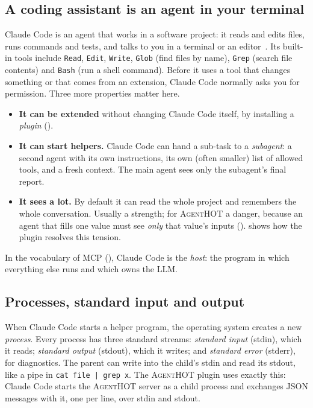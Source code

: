 \documentclass[10pt,a4paper]{article}
\newcommand{\tool}{\textsc{AgentHOT}}
\newcommand{\cc}{Claude Code}
\newcommand{\code}[1]{\texttt{#1}}
\begin{document}
\subsection{A coding assistant is an agent in your terminal}

\cc{} is an agent that works in a software project: it reads and edits
files, runs commands and tests, and talks to you in a terminal or an
editor~\cite{claudecodedocs}. Its built-in tools include \code{Read},
\code{Edit}, \code{Write}, \code{Glob} (find files by name), \code{Grep}
(search file contents) and \code{Bash} (run a shell command). Before it uses
a tool that changes something or that comes from an extension, \cc{}
normally asks you for permission. Three more properties matter here.

\begin{itemize}
\item \textbf{It can be extended} without changing \cc{} itself, by
installing a \emph{plugin} ().
\item \textbf{It can start helpers.} \cc{} can hand a sub-task to a
\emph{subagent}: a second agent with its own instructions, its own (often
smaller) list of allowed tools, and a fresh context. The main agent sees
only the subagent's final report.
\item \textbf{It sees a lot.} By default it can read the whole project and
remembers the whole conversation. Usually a strength; for \tool{} a danger,
because an agent that fills one value must see \emph{only} that value's
inputs ().  shows how the plugin
resolves this tension.
\end{itemize}

In the vocabulary of MCP (), \cc{} is the \emph{host}: the
program in which everything else runs and which owns the LLM.

\subsection{Processes, standard input and output}

When \cc{} starts a helper program, the operating system creates a new
\emph{process}. Every process has three standard streams: \emph{standard
input} (stdin), which it reads; \emph{standard output} (stdout), which it
writes; and \emph{standard error} (stderr), for diagnostics. The parent can
write into the child's stdin and read its stdout, like a pipe in
\code{cat file | grep x}. The \tool{} plugin uses exactly this: \cc{} starts
the \tool{} server as a child process and exchanges JSON messages with it,
one per line, over stdin and stdout.
\end{document}
